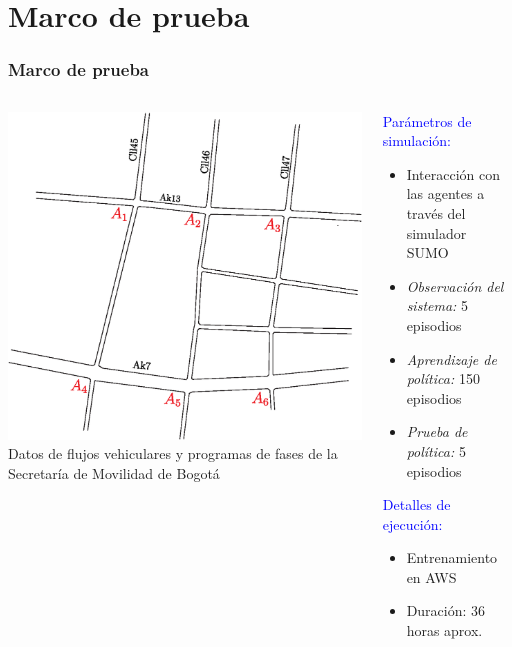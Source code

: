 \documentclass[11pt]{beamer}
\begin{document}
\section{Marco de prueba}
\begin{frame}
\frametitle{Marco de prueba}
\begin{columns}[T]
\begin{column}{.5\textwidth}
\includegraphics[scale=0.4]{./graficas/minicity.eps}\\
 Datos de flujos vehiculares y programas de fases de la Secretaría de Movilidad de Bogotá
\end{column}
\begin{column}{.5\textwidth}
\textcolor{blue}{Parámetros de simulación:}
\begin{itemize}
\item Interacción con las agentes a través del simulador SUMO
\item \textit{Observación del sistema:} 5 episodios
\item \textit{Aprendizaje de política:} 150 episodios
\item \textit{Prueba de política:} 5 episodios
\end{itemize}
\bigskip
\textcolor{blue}{Detalles de ejecución:}
\begin{itemize}
\item Entrenamiento en AWS
\item Duración: 36 horas aprox.
\end{itemize}
\end{column}
\end{columns}
\end{frame}
\end{document}

